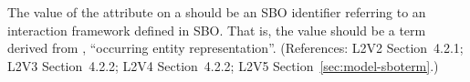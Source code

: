 The value of the  attribute on a \Model should be
an SBO identifier referring to an interaction framework defined
in SBO.  That is, the value should be a term derived from
\sbointeractionID, ``occurring entity representation''.  (References: L2V2
Section~4.2.1; L2V3 Section~4.2.2; L2V4 Section~4.2.2; L2V5 Section~\ref{sec:model-sboterm}.)
